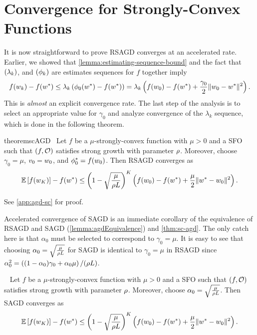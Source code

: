 \section{Convergence for Strongly-Convex Functions}\label{sec:agd-sc}

It is now straightforward to prove \ac{RSAGD} converges at an accelerated rate. 
Earlier, we showed that \autoref{lemma:estimating-sequence-bound} and the fact that \( \seq{\lambda_k} \), and \( \seq{\phi_k} \) are estimates sequences for \( f \) together imply
\[ f(\wk) - f(\wopt) \leq \lambda_k \rbr{\phi_0(\wopt) - f(\wopt)} = \lambda_k \rbr{f(\w_0) - f(\wopt) + \frac{\gamma_0}{2} \norm{\w_0 - \wopt}^2}. \]
This is \emph{almost} an explicit convergence rate. 
The last step of the analysis is to select an appropriate value for \( \gamma_0 \) and analyze convergence of the \( \lambda_k \) sequence, which is done in the following theorem.

\begin{restatable}{theorem}{scAGD}~\label{thm:sc-agd}
    Let \( f \) be a \( \mu \)-strongly-convex function with \( \mu > 0 \) and \oracle{} a \ac{SFO} such that \( \rbr{f, \oracle{}} \) satisfies strong growth with parameter \( \sgc \).
    Moreover, choose \( \gamma_0 = \mu \), \( v_0 = \w_0 \), and \( \phi_0^* = f(\w_0) \).
    Then \ac{RSAGD} converges as  
    \[ \E\sbr{f(\w_K)} - f(\wopt) \leq \rbr{1 - \sqrt{\frac{\mu}{\sgc L}}}^{K} \rbr{ f(w_0) - f(\wopt) + \frac{\mu}{2} \norm{\wopt - \w_0}^2 }.  \]
\end{restatable}
\noindent See \autoref{app:agd-sc} for proof.\hfill \break

Accelerated convergence of \ac{SAGD} is an immediate corollary of the equivalence of \ac{RSAGD} and \ac{SAGD} (\autoref{lemma:agdEquivalence}) and \autoref{thm:sc-agd}.
The only catch here is that \( \alpha_0 \) must be selected to correspond to \( \gamma_0 = \mu \).
It is easy to see that choosing \( \alpha_0 = \sqrt{\frac{\mu}{\sgc L}} \) for \ac{SAGD} is identical to \( \gamma_0 = \mu \) in \ac{RSAGD} since \( \alpha_0^2 = \rbr{(1 - \alpha_0)\gamma_0 + \alpha_0 \mu} / (\sgc L) \).

\begin{corollary}~\label{cor:sc-agd}
    Let \( f \) be a \( \mu \)-strongly-convex function with \( \mu > 0 \) and \oracle{} a \ac{SFO} such that \( \rbr{f, \oracle{}} \) satisfies strong growth with parameter \( \sgc \).
    Moreover, choose \( \alpha_0 = \sqrt{\frac{\mu}{\sgc L}} \). 
    Then \ac{SAGD} converges as  
    \[ \E\sbr{f(\w_K)} - f(\wopt) \leq \rbr{1 - \sqrt{\frac{\mu}{\sgc L}}}^{K} \rbr{ f(w_0) - f(\wopt) + \frac{\mu}{2} \norm{\wopt - \w_0}^2 }.  \]
\end{corollary}

